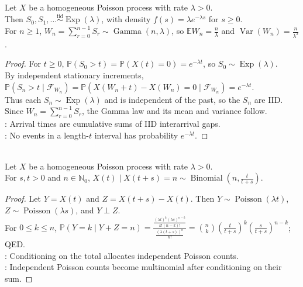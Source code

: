 \begin{theorem} \label{thm:poisson-interarrival-exponential} \\
Let $X$ be a homogeneous Poisson process with rate $\lambda>0$.\\
Then $S_0,S_1,\ldots\stackrel{\mathrm{iid}}{\sim}\operatorname{Exp}(\lambda)$, with density $f(s)=\lambda e^{-\lambda s}$ for $s\geq0$.\\
For $n\geq1$, $W_n=\sum\limits_{r=0}^{n-1}S_r\sim\operatorname{Gamma}(n,\lambda)$, so $\mathbb{E}W_n=\frac{n}{\lambda}$ and $\operatorname{Var}(W_n)=\frac{n}{\lambda^2}$.
\begin{proof} For $t\geq0$, $\mathbb{P}(S_0>t)=\mathbb{P}(X(t)=0)=e^{-\lambda t}$, so $S_0\sim\operatorname{Exp}(\lambda)$.\\
By independent stationary increments, $\mathbb{P}(S_n>t\mid\mathcal{F}_{W_n})=\mathbb{P}(X(W_n+t)-X(W_n)=0\mid\mathcal{F}_{W_n})=e^{-\lambda t}$.\\
Thus each $S_n\sim\operatorname{Exp}(\lambda)$ and is independent of the past, so the $S_n$ are IID.\\
Since $W_n=\sum\limits_{r=0}^{n-1}S_r$, the Gamma law and its mean and variance follow.\\
: Arrival times are cumulative sums of IID interarrival gaps.\\
: No events in a length-$t$ interval has probability $e^{-\lambda t}$.
\end{proof}
\end{theorem}

\begin{proposition} \label{prop:poisson-conditional-binomial-count} \\
Let $X$ be a homogeneous Poisson process with rate $\lambda>0$.\\
For $s,t>0$ and $n\in\mathbb{N}_0$, $X(t)\mid X(t+s)=n\sim\operatorname{Binomial}\left(n,\frac{t}{t+s}\right)$.
\begin{proof} Let $Y=X(t)$ and $Z=X(t+s)-X(t)$. Then $Y\sim\operatorname{Poisson}(\lambda t)$, $Z\sim\operatorname{Poisson}(\lambda s)$, and $Y\perp Z$.\\
For $0\leq k\leq n$, $\mathbb{P}(Y=k\mid Y+Z=n)=\frac{\frac{(\lambda t)^k(\lambda s)^{n-k}}{k!(n-k)!}}{\frac{(\lambda(t+s))^n}{n!}}=\binom{n}{k}\left(\frac{t}{t+s}\right)^k\left(\frac{s}{t+s}\right)^{n-k}$; QED.\\
: Conditioning on the total allocates independent Poisson counts.\\
: Independent Poisson counts become multinomial after conditioning on their sum.
\end{proof}
\end{proposition}

